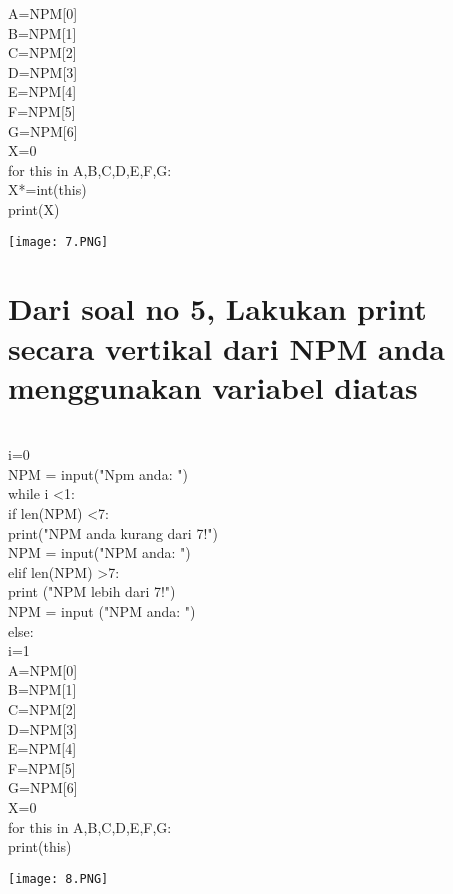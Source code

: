 \documentclass{article}
\begin{document}
A=NPM[0]\\
B=NPM[1]\\
C=NPM[2]\\
D=NPM[3]\\
E=NPM[4]\\
F=NPM[5]\\
G=NPM[6]\\

X=0\\

for this in A,B,C,D,E,F,G:\\
    X*=int(this)\\
print(X)\\
\begin{center}
    \texttt{[image: 7.PNG]}
\end{center}

\section{Dari soal no 5, Lakukan print secara vertikal dari NPM anda menggunakan variabel diatas}\\
i=0\\
NPM = input("Npm anda: ")\\
while i <1:\\
    if len(NPM) <7:\\
        print("NPM anda kurang dari 7!")\\
        NPM = input("NPM anda: ")\\
    elif len(NPM) >7:\\
        print ("NPM lebih dari 7!")\\
        NPM = input ("NPM anda: ")\\
    else:\\
        i=1\\

A=NPM[0]\\
B=NPM[1]\\
C=NPM[2]\\
D=NPM[3]\\
E=NPM[4]\\
F=NPM[5]\\
G=NPM[6]\\

X=0\\

for this in A,B,C,D,E,F,G:\\
    print(this)\\
\begin{center}
    \texttt{[image: 8.PNG]}
\end{center}
\end{document}
